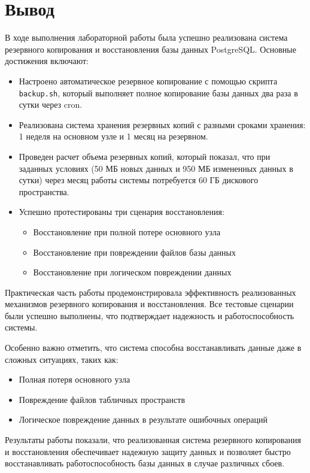 \section{Вывод}

В ходе выполнения лабораторной работы была успешно реализована система резервного копирования и восстановления базы данных PostgreSQL. Основные достижения включают:

\begin{itemize}
    \item Настроено автоматическое резервное копирование с помощью скрипта \texttt{backup.sh}, который выполняет полное копирование базы данных два раза в сутки через cron.
    \item Реализована система хранения резервных копий с разными сроками хранения: 1 неделя на основном узле и 1 месяц на резервном.
    \item Проведен расчет объема резервных копий, который показал, что при заданных условиях (50 МБ новых данных и 950 МБ измененных данных в сутки) через месяц работы системы потребуется 60 ГБ дискового пространства.
    \item Успешно протестированы три сценария восстановления:
    \begin{itemize}
        \item Восстановление при полной потере основного узла
        \item Восстановление при повреждении файлов базы данных
        \item Восстановление при логическом повреждении данных
    \end{itemize}
\end{itemize}

Практическая часть работы продемонстрировала эффективность реализованных механизмов резервного копирования и восстановления. Все тестовые сценарии были успешно выполнены, что подтверждает надежность и работоспособность системы.

Особенно важно отметить, что система способна восстанавливать данные даже в сложных ситуациях, таких как:
\begin{itemize}
    \item Полная потеря основного узла
    \item Повреждение файлов табличных пространств
    \item Логическое повреждение данных в результате ошибочных операций
\end{itemize}

Результаты работы показали, что реализованная система резервного копирования и восстановления обеспечивает надежную защиту данных и позволяет быстро восстанавливать работоспособность базы данных в случае различных сбоев.
